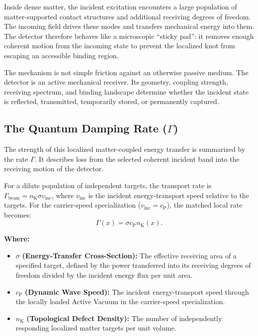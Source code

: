 Inside dense matter, the incident excitation encounters a large population of matter-supported contact structures and additional receiving degrees of freedom. The incoming field drives these modes and transfers mechanical energy into them. The detector therefore behaves like a microscopic ``sticky pad'': it removes enough coherent motion from the incoming state to prevent the localized knot from escaping an accessible binding region.

The mechanism is not simple friction against an otherwise passive medium. The detector is an active mechanical receiver. Its geometry, coupling strength, receiving spectrum, and binding landscape determine whether the incident state is reflected, transmitted, temporarily stored, or permanently captured.

\subsection{The Quantum Damping Rate ($\Gamma$)}

The strength of this localized matter-coupled energy transfer is summarized by the rate $\Gamma$. It describes loss from the selected coherent incident band into the receiving motion of the detector.

For a dilute population of independent targets, the transport rate is $\Gamma_{\mathrm{beam}} = n_{\mathrm K}\sigma v_{\mathrm{inc}}$, where $v_{\mathrm{inc}}$ is the incident energy-transport speed relative to the targets. For the carrier-speed specialization ($v_{\mathrm{inc}} = c_{\mathrm P}$), the matched local rate becomes:
\begin{equation}
    \Gamma(x)
    =
    \sigma c_{\mathrm P}n_{\mathrm K}(x).
\end{equation}

\noindent\textbf{Where:}
\begin{itemize}
    \item $\sigma$ \textbf{(Energy-Transfer Cross-Section):}
    The effective receiving area of a specified target, defined by the power transferred into its receiving degrees of freedom divided by the incident energy flux per unit area.

    \item $c_{\mathrm P}$ \textbf{(Dynamic Wave Speed):}
    The incident energy-transport speed through the locally loaded Active Vacuum in the carrier-speed specialization.

    \item $n_{\mathrm K}$ \textbf{(Topological Defect Density):}
    The number of independently responding localized matter targets per unit volume.
\end{itemize}

